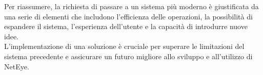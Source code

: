 Per riassumere, la richiesta di passare a un sistema più moderno è giustificata da
una serie di elementi che includono l'efficienza delle operazioni, la
possibilità di espandere il sistema, l'esperienza dell'utente e la capacità di introdurre
nuove idee.\\ L'implementazione di una soluzione è cruciale per superare le limitazioni
del sistema precedente e assicurare un futuro migliore allo sviluppo e all'utilizzo
di NetEye.
